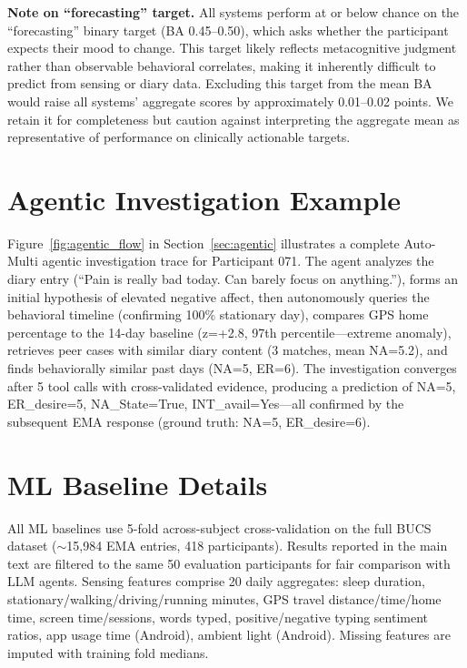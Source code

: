 \documentclass[screen,review,anonymous]{acmart}
\begin{document}
\noindent\textbf{Note on ``forecasting'' target.} All systems perform at or below chance on the ``forecasting'' binary target (BA 0.45--0.50), which asks whether the participant expects their mood to change. This target likely reflects metacognitive judgment rather than observable behavioral correlates, making it inherently difficult to predict from sensing or diary data. Excluding this target from the mean BA would raise all systems' aggregate scores by approximately 0.01--0.02 points. We retain it for completeness but caution against interpreting the aggregate mean as representative of performance on clinically actionable targets.

\section{Agentic Investigation Example}
\label{app:example}

Figure~\ref{fig:agentic_flow} in Section~\ref{sec:agentic} illustrates a complete Auto-Multi agentic investigation trace for Participant 071. The agent analyzes the diary entry (``Pain is really bad today. Can barely focus on anything.''), forms an initial hypothesis of elevated negative affect, then autonomously queries the behavioral timeline (confirming 100\% stationary day), compares GPS home percentage to the 14-day baseline (z=+2.8, 97th percentile---extreme anomaly), retrieves peer cases with similar diary content (3 matches, mean NA=5.2), and finds behaviorally similar past days (NA=5, ER=6). The investigation converges after 5 tool calls with cross-validated evidence, producing a prediction of NA=5, ER\_desire=5, NA\_State=True, INT\_avail=Yes---all confirmed by the subsequent EMA response (ground truth: NA=5, ER\_desire=6).


\section{ML Baseline Details}
\label{app:baselines}

All ML baselines use 5-fold across-subject cross-validation on the full BUCS dataset ($\sim$15,984 EMA entries, 418 participants). Results reported in the main text are filtered to the same 50 evaluation participants for fair comparison with LLM agents. Sensing features comprise 20 daily aggregates: sleep duration, stationary/walking/driving/running minutes, GPS travel distance/time/home time, screen time/sessions, words typed, positive/negative typing sentiment ratios, app usage time (Android), ambient light (Android). Missing features are imputed with training fold medians.
\end{document}
